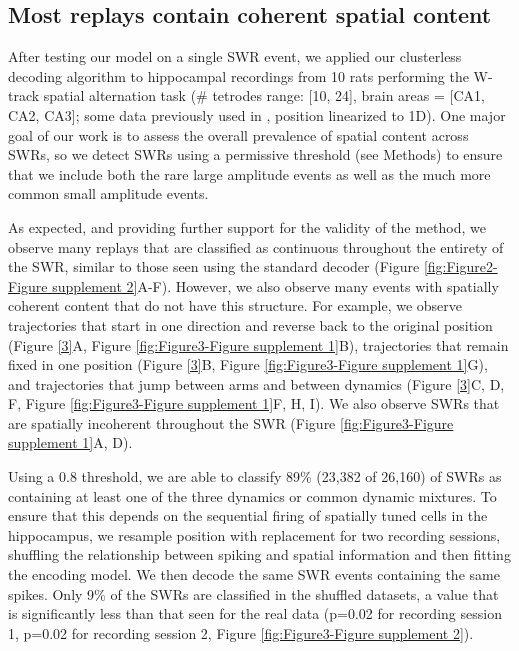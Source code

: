 \documentclass[times, twoside]{zHenriquesLab-StyleBioRxiv}
\begin{document}
\subsection*{Most replays contain coherent spatial content}

After testing our model on a single SWR event, we applied our clusterless decoding algorithm to hippocampal recordings from 10 rats performing the W-track spatial alternation task (\# tetrodes range: [10, 24], brain areas = [CA1, CA2, CA3]; some data previously used in \cite{KarlssonAwakereplayremote2009, KayConstantSubsecondCycling2020, CarrTransientSlowGamma2012}, position linearized to 1D). One major goal of our work is to assess the overall prevalence of spatial content across SWRs, so we detect SWRs using a permissive threshold (see Methods) to ensure that we include both the rare large amplitude events as well as the much more common small amplitude events. 

As expected, and providing further support for the validity of the method, we observe many replays that are classified as continuous throughout the entirety of the SWR, similar to those seen using the standard decoder (Figure \ref{fig:Figure2-Figure supplement 2}A-F). However, we also observe many events with spatially coherent content that do not have this structure. For example, we observe trajectories that start in one direction and reverse back to the original position (Figure \ref{3}A, Figure \ref{fig:Figure3-Figure supplement 1}B), trajectories that remain fixed in one position (Figure \ref{3}B, Figure \ref{fig:Figure3-Figure supplement 1}G), and trajectories that jump between arms and between dynamics (Figure \ref{3}C, D, F, Figure \ref{fig:Figure3-Figure supplement 1}F, H, I). We also observe SWRs that are spatially incoherent throughout the SWR (Figure \ref{fig:Figure3-Figure supplement 1}A, D).

Using a 0.8 threshold, we are able to classify 89\% (23,382 of 26,160) of SWRs as containing at least one of the three dynamics or common dynamic mixtures. To ensure that this depends on the sequential firing of spatially tuned cells in the hippocampus, we resample position with replacement for two recording sessions, shuffling the relationship between spiking and spatial information and then fitting the encoding model. We then decode the same SWR events containing the same spikes. Only 9\% of the SWRs are classified in the shuffled datasets, a value that is significantly less than that seen for the real data (p=0.02 for recording session 1, p=0.02 for recording session 2, Figure \ref{fig:Figure3-Figure supplement 2}).
\end{document}
